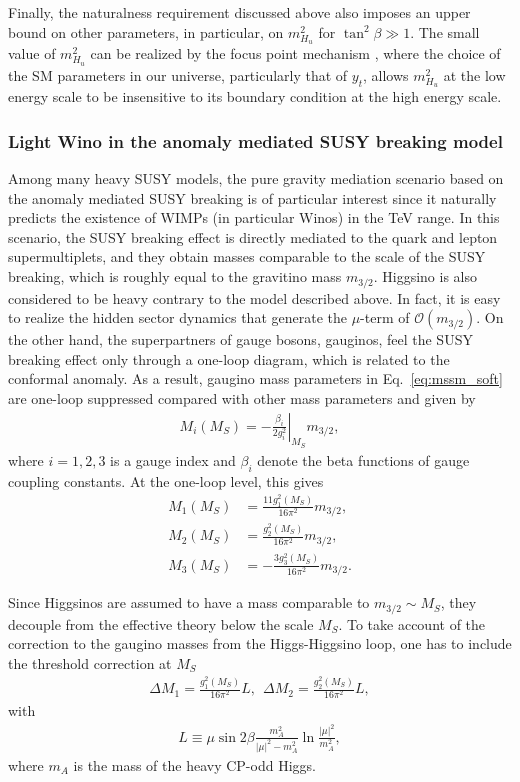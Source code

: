 \documentclass[12pt,twoside,book]{article}
\begin{document}
Finally, the naturalness requirement discussed above also imposes an upper bound on other parameters, in particular, on $m_{H_u}^2$ for $\tan^2 \beta \gg 1$.
The small value of $m_{H_u}^2$ can be realized by the focus point mechanism \cite{Feng:1999hg, Feng:1999mn, Feng:1999zg}, where the choice of the SM parameters in our universe, particularly that of $y_t$, allows $m_{H_u}^2$ at the low energy scale to be insensitive to its boundary condition at the high energy scale.


\subsubsection*{Light Wino in the anomaly mediated SUSY breaking model}

Among many heavy SUSY models, the pure gravity mediation scenario \cite{Ibe:2006de, Ibe:2011aa, ArkaniHamed:2012gw} based on the anomaly mediated SUSY breaking \cite{Giudice:1998xp, Randall:1998uk} is of particular interest since it naturally predicts the existence of WIMPs (in particular Winos) in the TeV range.
In this scenario, the SUSY breaking effect is directly mediated to the quark and lepton supermultiplets, and they obtain masses comparable to the scale of the SUSY breaking, which is roughly equal to the gravitino mass $m_{3/2}$.
Higgsino is also considered to be heavy contrary to the model described above.
In fact, it is easy to realize the hidden sector dynamics that generate the $\mu$-term of $\mathcal{O} (m_{3/2})$.
On the other hand, the superpartners of gauge bosons, gauginos, feel the SUSY breaking effect only through a one-loop diagram, which is related to the conformal anomaly.
As a result, gaugino mass parameters in Eq.~\eqref{eq:mssm_soft} are one-loop suppressed compared with other mass parameters and given by
\begin{align}
  M_i (M_S) = -\left. \frac{\beta_i}{2 g_i^2} \right|_{M_S} m_{3/2},
\end{align}
where $i=1,2,3$ is a gauge index and $\beta_i$ denote the beta functions of gauge coupling constants.
At the one-loop level, this gives
\begin{align}
  M_1 (M_S) &= \frac{11 g_1^2 (M_S)}{16 \pi^2} m_{3/2},\\
  M_2 (M_S) &= \frac{g_2^2 (M_S)}{16 \pi^2} m_{3/2},\\
  M_3 (M_S) &= -\frac{3 g_3^2 (M_S)}{16 \pi^2} m_{3/2}.
\end{align}

Since Higgsinos are assumed to have a mass comparable to $m_{3/2} \sim M_S$, they decouple from the effective theory below the scale $M_S$.
To take account of the correction to the gaugino masses from the Higgs-Higgsino loop, one has to include the threshold correction at $M_S$
\begin{align}
  \Delta M_1 = \frac{g_1^2 (M_S)}{16\pi^2} L,
  ~~
  \Delta M_2 = \frac{g_2^2 (M_S)}{16\pi^2} L,
\end{align}
with
\begin{align}
  L \equiv \mu \sin 2\beta \frac{m_A^2}{|\mu|^2 - m_A^2} \ln \frac{|\mu|^2}{m_A^2},
\end{align}
where $m_A$ is the mass of the heavy CP-odd Higgs.
\end{document}
